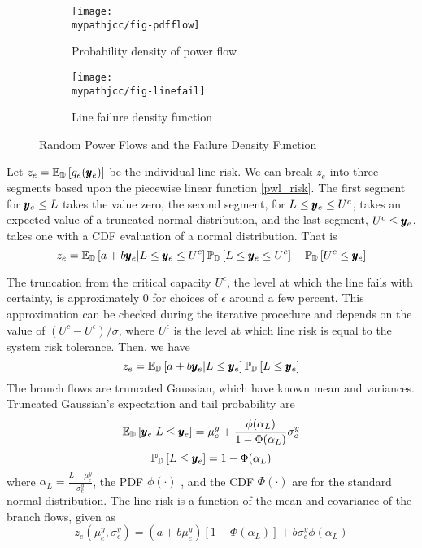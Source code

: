 \begin{figure}
 \centering                    
  \begin{subfigure}[b]{0.4\textwidth}
   \texttt{[image: \\mypathjcc/fig-pdfflow]}   
   \caption{Probability density of power flow}
  \end{subfigure}
  \begin{subfigure}[b]{.4\textwidth}
    \texttt{[image: \\mypathjcc/fig-linefail]}
    \caption{Line failure density function}
  \end{subfigure}
  \caption{Random Power Flows and the Failure Density Function}
\end{figure}




Let $ z_e = \mathbb{E}_{\mathbb{D}} \left[ g_e(\pmb{y}_e) \right] $ be the individual line risk. We can break $z_e$ into three segments based upon the piecewise linear function \ref{pwl_risk}.  The first segment for $\pmb{y}_e \leq L$ takes the value zero, the second segment, for $L \leq \pmb{y}_e \leq U^c$, takes an expected value of a truncated normal distribution, and the last segment, $U^c \leq \pmb{y}_e$, takes one with a CDF evaluation of a normal distribution.  That is
\[ z_e = \mathbb{E}_{\mathbb{D}} \left[  a+b\pmb{y}_e | L \leq \pmb{y}_e \leq U^c  \right] \mathbb{P}_{\mathbb{D}} \left[ L\leq \pmb{y}_e \leq U^c \right]  + \mathbb{P}_{\mathbb{D}} \left[  U^c \leq \pmb{y}_e  \right] \] 

 The truncation from the critical capacity $U^c$, the level at which the line fails with certainty, is approximately 0 for choices of $\epsilon$ around a few percent.  This approximation can be checked during the iterative procedure and depends on the value of $ (U^c - U^{\epsilon} )/\sigma $, where $U^\epsilon$ is the level at which line risk is equal to the system risk tolerance.  Then, we have
\[ z_e = \mathbb{E}_{\mathbb{D}} \left[  a+b\pmb{y}_e | L \leq \pmb{y}_e  \right] \mathbb{P}_{\mathbb{D}} \left[ L\leq \pmb{y}_e \right] \]
The branch flows are truncated Gaussian, which have known mean and variances. Truncated Gaussian's expectation and tail probability are
\[  \mathbb{E}_{\mathbb{D}} \left[  \pmb{y}_e | L \leq \pmb{y}_e  \right] = \mu^y_e + \frac{\phi( \alpha_L )}{ 1- \Phi(\alpha_L)} \sigma^y_e \]
\[ \mathbb{P}_{\mathbb{D}} \left[  L \leq \pmb{y}_e  \right] = 1 - \Phi(\alpha_L) \]
where $\alpha_L = \frac{L - \mu^y_e}{\sigma^y_e}$, the PDF $\phi(\cdot)$ , and the CDF $\Phi(\cdot)$ are for the standard normal distribution.  The line risk is a function of the mean and covariance of the branch flows, given as
\begin{equation}\label{line_risk}
z_e(\mu^y_e,\sigma^y_e) = (a + b \mu^y_e)\left[ 1 - \Phi(\alpha_L) \right]  + b \sigma^y_e \phi(\alpha_L) 
\end{equation}







